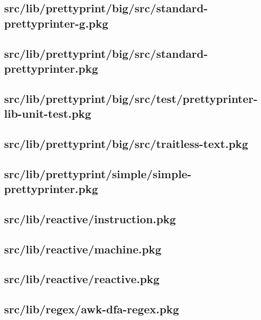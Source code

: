 \subsection{src/lib/prettyprint/big/src/standard-prettyprinter-g.pkg}


\subsection{src/lib/prettyprint/big/src/standard-prettyprinter.pkg}


\subsection{src/lib/prettyprint/big/src/test/prettyprinter-lib-unit-test.pkg}


\subsection{src/lib/prettyprint/big/src/traitless-text.pkg}


\subsection{src/lib/prettyprint/simple/simple-prettyprinter.pkg}


\subsection{src/lib/reactive/instruction.pkg}


\subsection{src/lib/reactive/machine.pkg}


\subsection{src/lib/reactive/reactive.pkg}


\subsection{src/lib/regex/awk-dfa-regex.pkg}


